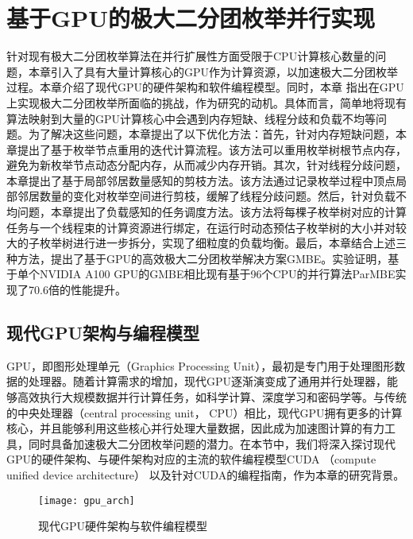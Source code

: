 \chapter{基于GPU的极大二分团枚举并行实现}
\label{ch:gmbe}

针对现有极大二分团枚举算法在并行扩展性方面受限于CPU计算核心数量的问题，本章引入了具有大量计算核心的GPU作为计算资源，以加速极大二分团枚举过程。本章介绍了现代GPU的硬件架构和软件编程模型。同时，本章%
指出在GPU上实现极大二分团枚举所面临的挑战，作为研究的动机。具体而言，简单地将现有算法映射到大量的GPU计算核心中会遇到内存短缺、线程分歧和负载不均等问题。为了解决这些问题，本章提出了以下优化方法：首先，针对内存短缺问题，本章提出了基于枚举节点重用的迭代计算流程。该方法可以重用枚举树根节点内存，避免为新枚举节点动态分配内存，从而减少内存开销。其次，针对线程分歧问题，本章提出了基于局部邻居数量感知的剪枝方法。该方法通过记录枚举过程中顶点局部邻居数量的变化对枚举空间进行剪枝，缓解了线程分歧问题。然后，针对负载不均问题，本章提出了负载感知的任务调度方法。该方法将每棵子枚举树对应的计算任务与一个线程束的计算资源进行绑定，在运行时动态预估子枚举树的大小并对较大的子枚举树进行进一步拆分，实现了细粒度的负载均衡。最后，本章结合上述三种方法，提出了基于GPU的高效极大二分团枚举解决方案GMBE。实验证明，基于单个NVIDIA A100 GPU的GMBE相比现有基于96个CPU的并行算法ParMBE实现了70.6倍的性能提升。

\section{现代GPU架构与编程模型} 
\label{sec:gpu_arch}
GPU，即图形处理单元（Graphics Processing Unit），最初是专门用于处理图形数据的处理器。随着计算需求的增加，现代GPU逐渐演变成了通用并行处理器，能够高效执行大规模数据并行计算任务，如科学计算、深度学习和密码学等。与传统的中央处理器（central processing unit， CPU）相比，现代GPU拥有更多的计算核心，并且能够利用这些核心并行处理大量数据，因此成为加速图计算的有力工具，同时具备加速极大二分团枚举问题的潜力。在本节中，我们将深入探讨现代GPU的硬件架构、与硬件架构对应的主流的软件编程模型CUDA （compute unified device architecture） 以及针对CUDA的编程指南，作为本章的研究背景。

\begin{figure} [t]
  \center
		\texttt{[image: gpu\_arch]}
     \vspace{-0.1in}
	\caption{现代GPU硬件架构与软件编程模型}
	\label{fig:gpu}
\end{figure}

